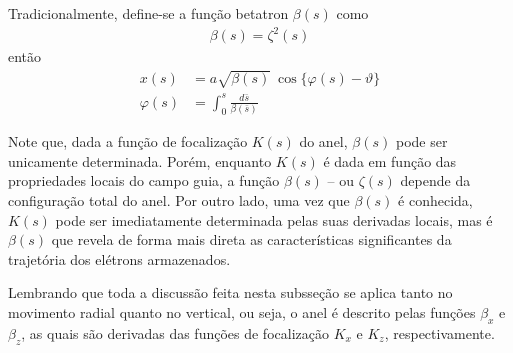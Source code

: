 Tradicionalmente, define-se a função betatron $\beta(s)$ como
\begin{align}
	\beta(s) = \zeta^2(s)
\end{align}
então
\begin{align}
	x(s) &= a\sqrt{\beta(s)}\ \cos\{\varphi(s)-\vartheta\}\label{eq:2.43}\\
	\varphi(s) &= \int_{0}^{s} \frac{d\bar{s}}{\beta(\bar{s})}\label{eq:2.44}
\end{align}
	
Note que, dada a função de focalização $K(s)$ do anel, $\beta(s)$ pode ser unicamente determinada. Porém, enquanto $K(s)$ é dada em função das propriedades locais do campo guia, a função $\beta(s)$ -- ou $\zeta(s)$ depende da configuração total do anel. Por outro lado, uma vez que $\beta(s)$ é conhecida, $K(s)$ pode ser imediatamente determinada pelas suas derivadas locais, mas é $\beta(s)$ que revela de forma mais direta as características significantes da trajetória dos elétrons armazenados.
	
Lembrando que toda a discussão feita nesta subsseção se aplica tanto no movimento radial quanto no vertical, ou seja, o anel é descrito pelas funções $\beta_x$ e $\beta_z$, as quais são derivadas das funções de focalização $K_x$ e $K_z$, respectivamente.